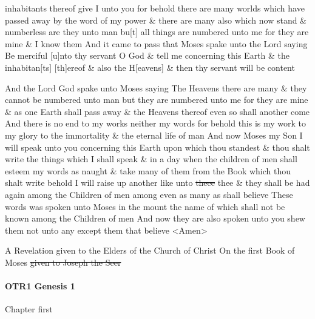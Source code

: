inhabitants thereof give I unto you for behold there are many worlds which have passed away by the word of my power \& there are many also which now stand \& numberless are they unto man bu[t] all things are numbered unto me for they are mine \& I know them And it came to pass that Moses spake unto the Lord saying Be merciful [u]nto thy servant O God \& tell me concerning this Earth \& the inhabitan[ts] [th]ereof \& also the H[eavens] \& then thy servant will be content
		
		And the Lord God spake unto Moses saying The Heavens there are many \& they cannot be numbered unto man but they are numbered unto me for they are mine \& as one Earth shall pass away \& the Heavens thereof even so shall another come And there is no end to my works neither my words for behold this is my work to my glory to the immortality \& the eternal life of man And now Moses my Son I will speak unto you concerning this Earth upon which thou standest \& thou shalt write the things which I shall speak \& in a day when the children of men shall esteem my words as naught \& take many of them from the Book which thou shalt write behold I will raise up another like unto \sout{theee} thee \& they shall be had again among the Children of men among even as many as shall believe These words was spoken unto Moses in the mount the name of which shall not be known among the Children of men And now they are also spoken unto you shew them not unto any except them that believe <Amen>
 
		A Revelation given to the Elders of the Church of Christ On the first Book of Moses \sout{given to Joseph the Seer}
		
	\paragraph{OTR1 Genesis 1}
		\label{JST-OTR1-GENESIS-1}
		
		\begin{tightcenter}
		Chapter first
		\end{tightcenter}
		
